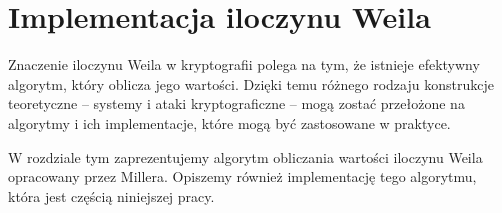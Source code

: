 \chapter{Implementacja iloczynu Weila}

\noindent
Znaczenie iloczynu Weila w kryptografii polega na tym,
że istnieje efektywny algorytm,
który oblicza jego wartości.
Dzięki temu różnego rodzaju konstrukcje teoretyczne --
systemy i ataki kryptograficzne --
mogą zostać przełożone na algorytmy i ich implementacje,
które mogą być zastosowane w praktyce.

\noindent
W rozdziale tym zaprezentujemy algorytm obliczania wartości iloczynu Weila
opracowany przez Millera.
Opiszemy również implementację tego algorytmu,
która jest częścią niniejszej pracy.








